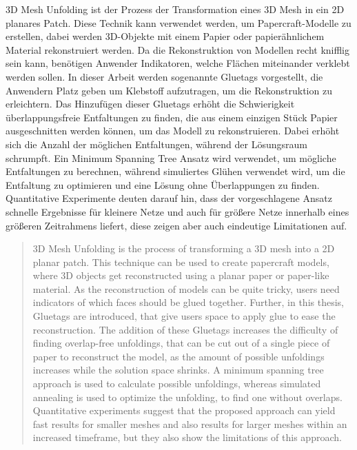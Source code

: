 \documentclass[draft,final]{vutinfth} %
\begin{document}
\begin{kurzfassung}
3D Mesh Unfolding ist der Prozess der Transformation eines 3D Mesh in ein 2D planares Patch. Diese Technik kann verwendet werden, um Papercraft-Modelle zu erstellen, dabei werden 3D-Objekte mit einem Papier oder papierähnlichem Material rekonstruiert werden. Da die Rekonstruktion von Modellen recht knifflig sein kann, benötigen Anwender Indikatoren, welche Flächen miteinander verklebt werden sollen. In dieser Arbeit werden sogenannte Gluetags vorgestellt, die Anwendern Platz geben um Klebstoff aufzutragen, um die Rekonstruktion zu erleichtern. Das Hinzufügen dieser Gluetags erhöht die Schwierigkeit überlappungsfreie Entfaltungen zu finden, die aus einem einzigen Stück Papier ausgeschnitten werden können, um das Modell zu rekonstruieren. Dabei erhöht sich die Anzahl der möglichen Entfaltungen, während der Lösungsraum schrumpft. Ein Minimum Spanning Tree Ansatz wird verwendet, um mögliche Entfaltungen zu berechnen, während simuliertes Glühen verwendet wird, um die Entfaltung zu optimieren und eine Lösung ohne Überlappungen zu finden. Quantitative Experimente deuten darauf hin, dass der vorgeschlagene Ansatz schnelle Ergebnisse für kleinere Netze und auch für größere Netze innerhalb eines größeren Zeitrahmens liefert, diese zeigen aber auch eindeutige Limitationen auf.
\end{kurzfassung}

\begin{abstract}
3D Mesh Unfolding is the process of transforming a 3D mesh into a 2D planar patch. This technique can be used to create papercraft models, where 3D objects get reconstructed using a planar paper or paper-like material. As the reconstruction of models can be quite tricky, users need indicators of which faces should be glued together. Further, in this thesis, Gluetags are introduced, that give users space to apply glue to ease the reconstruction. The addition of these Gluetags increases the difficulty of finding overlap-free unfoldings, that can be cut out of a single piece of paper to reconstruct the model, as the amount of possible unfoldings increases while the solution space shrinks. A minimum spanning tree approach is used to calculate possible unfoldings, whereas simulated annealing is used to optimize the unfolding, to find one without overlaps. Quantitative experiments suggest that the proposed approach can yield fast results for smaller meshes and also results for larger meshes within an increased timeframe, but they also show the limitations of this approach.
\end{abstract}
\end{document}

